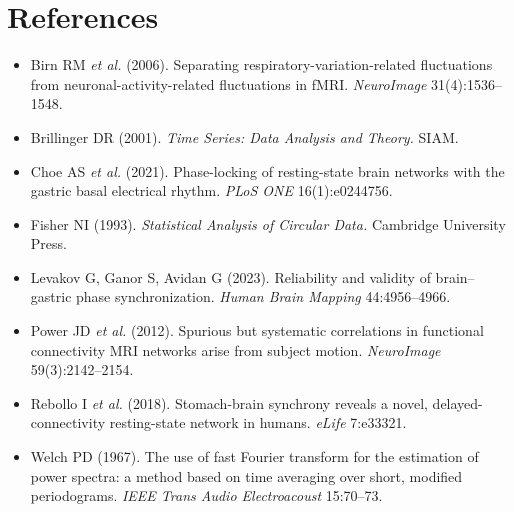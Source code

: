 \documentclass[11pt]{article}
\begin{document}
\section*{References}

\begin{itemize}
\item Birn RM \textit{et al.} (2006). Separating
respiratory-variation-related fluctuations from
neuronal-activity-related fluctuations in fMRI. \textit{NeuroImage}
31(4):1536--1548.
\item Brillinger DR (2001). \textit{Time Series: Data Analysis and
Theory.} SIAM.
\item Choe AS \textit{et al.} (2021). Phase-locking of resting-state
brain networks with the gastric basal electrical rhythm. \textit{PLoS
ONE} 16(1):e0244756.
\item Fisher NI (1993). \textit{Statistical Analysis of Circular Data.}
Cambridge University Press.
\item Levakov G, Ganor S, Avidan G (2023). Reliability and validity of
brain--gastric phase synchronization. \textit{Human Brain Mapping}
44:4956--4966.
\item Power JD \textit{et al.} (2012). Spurious but systematic
correlations in functional connectivity MRI networks arise from subject
motion. \textit{NeuroImage} 59(3):2142--2154.
\item Rebollo I \textit{et al.} (2018). Stomach-brain synchrony reveals
a novel, delayed-connectivity resting-state network in humans.
\textit{eLife} 7:e33321.
\item Welch PD (1967). The use of fast Fourier transform for the
estimation of power spectra: a method based on time averaging over
short, modified periodograms. \textit{IEEE Trans Audio Electroacoust}
15:70--73.
\end{itemize}
\end{document}
